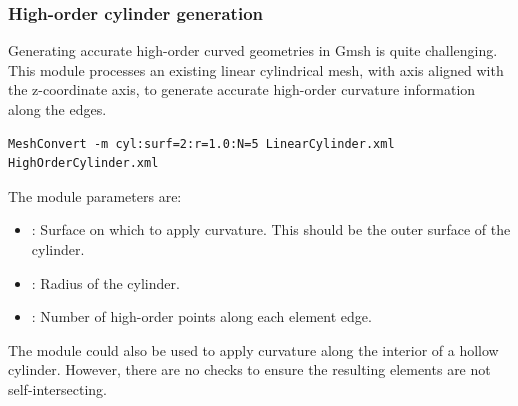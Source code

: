 \subsubsection{High-order cylinder generation}
Generating accurate high-order curved geometries in Gmsh is quite challenging.
This module processes an existing linear cylindrical mesh, with axis aligned
with the z-coordinate axis, to generate accurate high-order curvature
information along the edges.
\begin{lstlisting}[style=BashInputStyle]
MeshConvert -m cyl:surf=2:r=1.0:N=5 LinearCylinder.xml HighOrderCylinder.xml
\end{lstlisting}
The module parameters are:
\begin{itemize}
    \item {}: Surface on which to apply curvature. This should be the
        outer surface of the cylinder.
    \item {}: Radius of the cylinder.
    \item {}: Number of high-order points along each element edge.
\end{itemize}

\begin{notebox}
    The module could also be used to apply curvature along the interior of a
    hollow cylinder. However, there are no checks to ensure the resulting
    elements are not self-intersecting.
\end{notebox}
